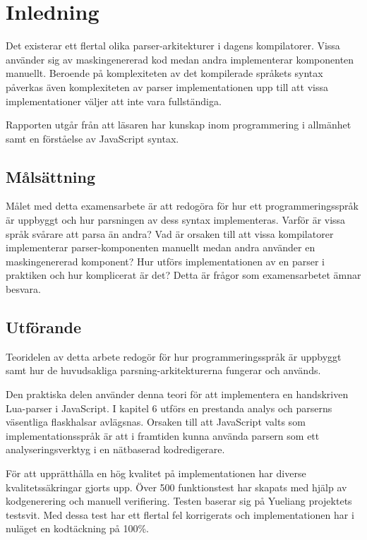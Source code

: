 \section{Inledning}

Det existerar ett flertal olika parser-arkitekturer i dagens kompilatorer.
Vissa använder sig av maskingenererad kod medan andra implementerar
komponenten manuellt. Beroende på komplexiteten av det kompilerade språkets
syntax påverkas även komplexiteten av parser implementationen upp till att
vissa implementationer väljer att inte vara fullständiga.

Rapporten utgår från att läsaren har kunskap inom programmering i allmänhet
samt en förståelse av JavaScript syntax.

\subsection{Målsättning}

Målet med detta examensarbete är att redogöra för hur ett programmeringsspråk
är uppbyggt och hur parsningen av dess syntax implementeras. Varför är vissa
språk svårare att parsa än andra? Vad är orsaken till att vissa kompilatorer
implementerar parser-komponenten manuellt medan andra använder en
maskingenererad komponent? Hur utförs implementationen av en parser i
praktiken och hur komplicerat är det? Detta är frågor som examensarbetet ämnar
besvara.

\subsection{Utförande}

Teoridelen av detta arbete redogör för hur programmeringsspråk är uppbyggt
samt hur de huvudsakliga parsning-arkitekturerna fungerar och används.

Den praktiska delen använder denna teori för att implementera en handskriven
Lua-parser i JavaScript. I kapitel 6 utförs en prestanda analys och parserns
väsentliga flaskhalsar avlägsnas. Orsaken till att JavaScript valts som
implementationsspråk är att i framtiden kunna använda parsern som ett
analyseringsverktyg i en nätbaserad kodredigerare.

För att upprätthålla en hög kvalitet på implementationen har diverse
kvalitetssäkringar gjorts upp. Över 500 funktionstest har skapats med hjälp av
kodgenerering och manuell verifiering. Testen baserar sig på Yueliang
projektets testsvit. Med dessa test har ett flertal fel korrigerats och
implementationen har i nuläget en kodtäckning på 100\%.

